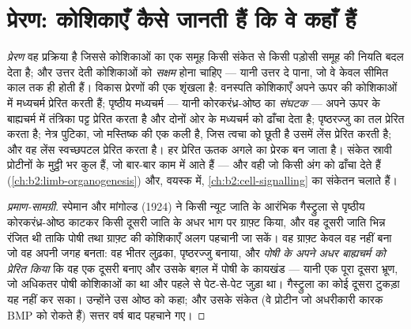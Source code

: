 \section{प्रेरण: कोशिकाएँ कैसे जानती हैं कि वे कहाँ हैं}

\begin{definition}[प्रेरण और सक्षमता]\label{def:b2:vertebrate-development:induction}
\emph{प्रेरण} वह प्रक्रिया है जिससे कोशिकाओं का एक समूह किसी संकेत से
किसी पड़ोसी समूह की नियति बदल देता है; और उत्तर देती कोशिकाओं को
\emph{सक्षम} होना चाहिए --- यानी उत्तर दे पाना, जो वे केवल सीमित काल तक
ही होती हैं। विकास प्रेरणों की एक शृंखला है: वनस्पति
कोशिकाएँ अपने ऊपर की कोशिकाओं में मध्यचर्म प्रेरित करती हैं; पृष्ठीय
मध्यचर्म --- यानी कोरकरंध्र-ओष्ठ का \emph{संघटक} --- अपने ऊपर के
बाह्यचर्म में तंत्रिका पट्ट प्रेरित करता है और दोनों ओर के मध्यचर्म को
ढाँचा देता है; पृष्ठरज्जु  का तल प्रेरित करता है;
नेत्र पुटिका, जो मस्तिष्क की एक कली है, जिस त्वचा को छूती है उसमें
लेंस प्रेरित करती है; और वह लेंस स्वच्छपटल प्रेरित करता है। हर प्रेरित
ऊतक अगले का प्रेरक बन जाता है। संकेत स्रावी प्रोटीनों के मुट्ठी भर कुल
हैं, जो बार-बार काम में आते हैं --- और वही जो किसी अंग को ढाँचा देते हैं
(\cref{ch:b2:limb-organogenesis}) और, वयस्क में,
\cref{ch:b2:cell-signalling} का संकेतन चलाते हैं।
\end{definition}
\begin{proof}[प्रमाण-सामग्री]
स्पेमान और मांगोल्ड (1924) ने किसी न्यूट जाति के आरंभिक गैस्ट्रुला से
पृष्ठीय कोरकरंध्र-ओष्ठ काटकर किसी दूसरी जाति के अधर
भाग पर ग्राफ़्ट किया, और वह दूसरी जाति भिन्न रंजित थी ताकि पोषी तथा
ग्राफ़्ट की कोशिकाएँ अलग पहचानी जा सकें। वह ग्राफ़्ट केवल वह नहीं बना जो
वह अपनी जगह बनता: वह भीतर लुढ़का, पृष्ठरज्जु बनाया, और
\emph{पोषी के अपने अधर बाह्यचर्म को प्रेरित किया} कि वह एक दूसरी
 बनाए और उसके बग़ल में पोषी के कायखंड --- यानी एक पूरा दूसरा
भ्रूण, जो अधिकतर पोषी कोशिकाओं का था और पहले से पेट-से-पेट जुड़ा था।
गैस्ट्रुला का कोई दूसरा टुकड़ा यह नहीं कर सका। उन्होंने उस ओष्ठ को
 कहा; और उसके संकेत (वे प्रोटीन जो अधरीकारी
कारक BMP को रोकते हैं) सत्तर वर्ष बाद पहचाने गए।
\end{proof}

